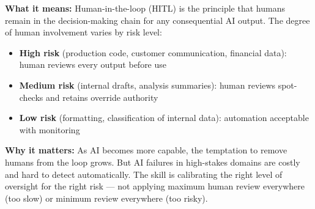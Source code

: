 \textbf{What it means:}
Human-in-the-loop (HITL) is the principle that humans remain in the decision-making
chain for any consequential AI output.
The degree of human involvement varies by risk level:
\begin{itemize}
  \item \textbf{High risk} (production code, customer communication, financial data):
    human reviews every output before use
  \item \textbf{Medium risk} (internal drafts, analysis summaries): human reviews
    spot-checks and retains override authority
  \item \textbf{Low risk} (formatting, classification of internal data): automation
    acceptable with monitoring
\end{itemize}

\textbf{Why it matters:}
As AI becomes more capable, the temptation to remove humans from the loop grows.
But AI failures in high-stakes domains are costly and hard to detect automatically.
The skill is calibrating the right level of oversight for the right risk --- not
applying maximum human review everywhere (too slow) or minimum review everywhere
(too risky).
